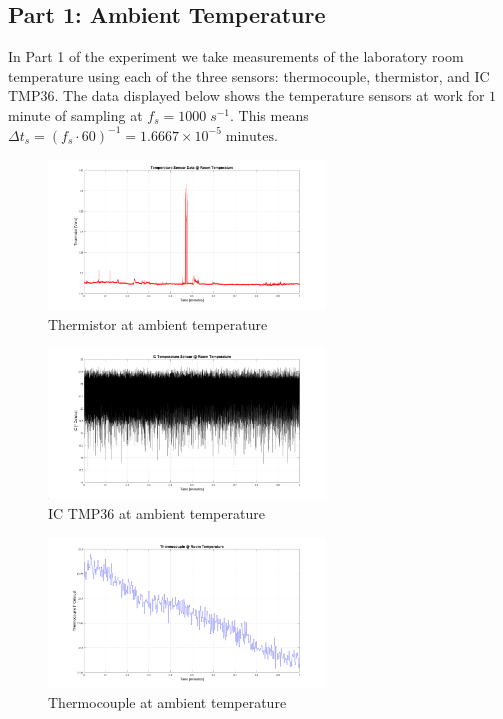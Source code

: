 \documentclass{article}
\begin{document}
    \subsection{Part 1: Ambient Temperature}
    In Part 1 of the experiment we take measurements of the laboratory room temperature using each of the three sensors: thermocouple, thermistor, and IC TMP36. The data displayed below shows the temperature sensors at work for $1$ minute of sampling at $f_{s} = 1000\; s^{-1}$. This means $\Delta t_{s} = (f_{s}\cdot 60)^{-1} = 1.6667\times10^{-5}\; \text{minutes}$.
    
    \begin{figure}[H]
        \centering
        \includegraphics[width=0.655\textwidth]{lab2images/thermistor_volt_roomtemp_1min_plot.png}
        \caption{Thermistor at ambient temperature}
    \end{figure}
    
    \begin{figure}[H]
        \centering
        \includegraphics[width=0.655\textwidth]{lab2images/ICTMP36_roomtemp_1min_plot.png}
        \caption{IC TMP36 at ambient temperature}
    \end{figure}
    
    \begin{figure}[H]
        \centering
        \includegraphics[width=0.655\textwidth]{lab2images/thermocouple_roomtemp_1min_plot.png}
        \caption{Thermocouple at ambient temperature}
    \end{figure}
\end{document}
